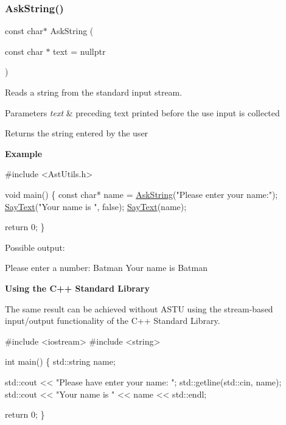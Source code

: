 \subsubsection{\texorpdfstring{Ask\+String()}{AskString()}}
{\footnotesize\ttfamily const char$\ast$ Ask\+String (\begin{DoxyParamCaption}\item[{const char $\ast$}]{text = {\ttfamily nullptr} }\end{DoxyParamCaption})}

Reads a string from the standard input stream.


\begin{DoxyParams}{Parameters}
{\em text} & preceding text printed before the use input is collected \\
\hline
\end{DoxyParams}
\begin{DoxyReturn}{Returns}
the string entered by the user
\end{DoxyReturn}
{\bfseries Example} 
\begin{DoxyCode}
\textcolor{preprocessor}{#include <AstUtils.h>}

\textcolor{keywordtype}{void} main()
\{
  \textcolor{keyword}{const} \textcolor{keywordtype}{char}* name = \hyperlink{group__io__group_ga89af41351370788f6b9d33fd0bd89d91}{AskString}(\textcolor{stringliteral}{"Please enter your name:"});
  \hyperlink{group__io__group_ga82cdf45375c3b92b2a60c3d9b55d682f}{SayText}(\textcolor{stringliteral}{"Your name is "}, \textcolor{keyword}{false});
  \hyperlink{group__io__group_ga82cdf45375c3b92b2a60c3d9b55d682f}{SayText}(name);

  \textcolor{keywordflow}{return} 0;
\}
\end{DoxyCode}
 Possible output\+: 
\begin{DoxyCode}
Please enter a number: Batman
Your name is Batman
\end{DoxyCode}


{\bfseries Using the C++ Standard Library}

The same result can be achieved without A\+S\+TU using the stream-\/based input/output functionality of the C++ Standard Library.


\begin{DoxyCode}
\textcolor{preprocessor}{#include <iostream>}
\textcolor{preprocessor}{#include <string>}

\textcolor{keywordtype}{int} main()
\{
  std::string name;

  std::cout << \textcolor{stringliteral}{"Please have enter your name: "};
  std::getline(std::cin, name);
  std::cout << \textcolor{stringliteral}{"Your name is "} << name << std::endl;

  \textcolor{keywordflow}{return} 0;
\}
\end{DoxyCode}
 \mbox{\label{group__io__group_ga6af59270fa536fa4c3e9f8434a8fb4a0}} 
